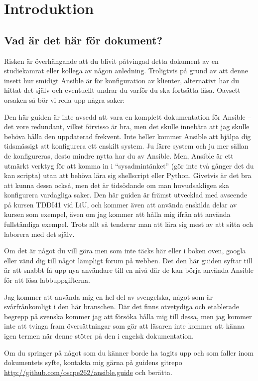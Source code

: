 \section{Introduktion}
\subsection{Vad är det här för dokument?}
Risken är överhängande att du blivit påtvingad detta dokument av en studiekamrat eller kollega av någon anledning. 
Troligtvis på grund av att denne insett hur smidigt Ansible är för konfiguration av klienter, 
alternativt har du hittat det själv och eventuellt undrar du varför du ska fortsätta läsa. Oavsett orsaken så bör vi reda upp några saker:

Den här guiden är inte avsedd att vara en komplett dokumentation för Ansible -- det vore redundant, vilket förvisso är bra, men det skulle innebära att jag skulle behöva hålla den uppdaterad frekvent.
Inte heller kommer Ansible att hjälpa dig tidsmässigt att konfigurera ett enskilt system. Ju färre system och ju mer sällan de konfigureras, desto mindre nytta har du av Ansible.
Men, Ansible är ett utmärkt verktyg för att komma in i ``sysadmintänket'' (gör inte två gånger det du kan scripta) utan att behöva lära sig shellscript eller Python. Givetvis är det bra att kunna dessa också, men det är tidsödande
om man huvudsakligen ska konfigurera vardagliga saker.
Den här guiden är främst utvecklad med avseende på kursen TDDI41 vid LiU, och kommer även att använda enskilda delar av kursen som exempel, även om jag kommer att hålla mig ifrån att använda fullständiga exempel.
Trots allt så tenderar man att lära sig mest av att sitta och laborera med det själv.

Om det är något du vill göra men som inte täcks här eller i boken oven, googla eller vänd dig till något lämpligt forum på webben. 
Det den här guiden syftar till är att snabbt få upp nya användare till en nivå där de kan börja använda Ansible för att lösa labbuppgifterna.

Jag kommer att använda mig en hel del av svengelska, något som är svårfrånkomligt i den här branschen. Där det finns
otvetydiga och etablerade begrepp på svenska kommer jag att försöka hålla mig till dessa, men jag kommer inte att
tvinga fram översättningar som gör att läsaren inte kommer att känna igen termen när denne stöter på den i engelsk dokumentation.

Om du springer på något som du känner borde ha tagits upp och som faller inom dokumentets syfte, kontakta mig gärna på guidens gitrepo \href{http://github.com/oscpe262/ansible.guide}{\url{http://github.com/oscpe262/ansible.guide}} och berätta.

